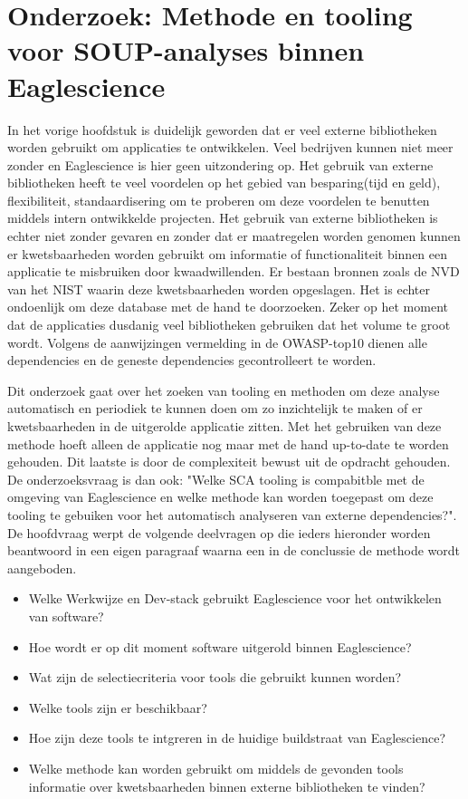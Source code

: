 
\chapter{Onderzoek: Methode en tooling voor SOUP-analyses binnen Eaglescience}\label{ch:onderzoek-tool-methode}
In het vorige hoofdstuk is duidelijk geworden dat er veel externe bibliotheken worden gebruikt om applicaties te ontwikkelen. Veel bedrijven kunnen niet meer zonder en Eaglescience is hier geen uitzondering op. Het gebruik van externe bibliotheken heeft te veel voordelen op het gebied van besparing(tijd en geld), flexibiliteit, standaardisering om te proberen om deze voordelen te benutten middels intern ontwikkelde projecten. Het gebruik van externe bibliotheken is echter niet zonder gevaren en zonder dat er maatregelen worden genomen kunnen er kwetsbaarheden worden gebruikt om informatie of functionaliteit binnen een applicatie te misbruiken door kwaadwillenden. Er bestaan bronnen zoals de NVD van het NIST waarin deze kwetsbaarheden worden opgeslagen. Het is echter ondoenlijk om deze database met de hand te doorzoeken. Zeker op het moment dat de applicaties dusdanig veel bibliotheken gebruiken dat het volume te groot wordt. Volgens de aanwijzingen vermelding in de OWASP-top10 dienen alle dependencies en de geneste dependencies gecontrolleert te worden.

Dit onderzoek gaat over het zoeken van tooling en methoden om deze analyse automatisch en periodiek te kunnen doen om zo inzichtelijk te maken of er kwetsbaarheden in de uitgerolde applicatie zitten. Met het gebruiken van deze methode hoeft alleen de applicatie nog maar met de hand up-to-date te worden gehouden. Dit laatste is door de complexiteit bewust uit de opdracht gehouden. De onderzoeksvraag is dan ook: "Welke SCA tooling is compabitble met de omgeving van Eaglescience en welke methode kan worden toegepast om deze tooling te gebuiken voor het automatisch analyseren van externe dependencies?". De hoofdvraag werpt de volgende deelvragen op die ieders hieronder worden beantwoord in een eigen paragraaf waarna een in de conclussie de methode wordt aangeboden.
\begin{itemize}
    \item Welke Werkwijze en Dev-stack gebruikt Eaglescience voor het ontwikkelen van software?
    \item Hoe wordt er op dit moment software uitgerold binnen Eaglescience?
    \item Wat zijn de selectiecriteria voor tools die gebruikt kunnen worden?
    \item Welke tools zijn er beschikbaar?
    \item Hoe zijn deze tools te intgreren in de huidige buildstraat van Eaglescience?
    \item Welke methode kan worden gebruikt om middels de gevonden tools informatie over kwetsbaarheden binnen externe bibliotheken te vinden?
\end{itemize}


